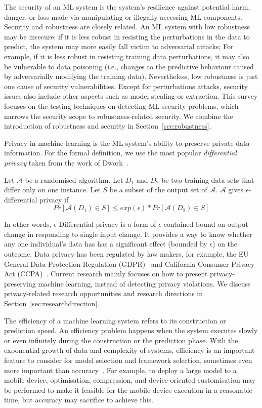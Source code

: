 The security of an ML system is the system's resilience against potential harm, danger, or loss made via manipulating or illegally accessing ML components.
Security and robustness are closely related. 
An ML system with low robustness may be insecure:
if it is less robust in resisting the perturbations in the data to predict, the system may more easily fall victim to adversarial attacks;
For example,
if it is less robust in resisting training data perturbations, it may also be vulnerable to data poisoning (i.e., changes to the predictive behaviour caused by adversarially modifying the training data).
Nevertheless, low robustness is just one cause of security vulnerabilities.
Except for perturbations attacks, security issues also include other aspects such as model stealing or extraction. 
This survey focuses on the testing techniques on detecting ML security problems, which narrows the security scope to robustness-related security.  
We combine the introduction of robustness and security in Section~\ref{sec:robustness}.

Privacy in machine learning is the ML system's ability to preserve private data information. 
For the formal definition, we use the most popular \emph{differential privacy} taken from the work of Dwork~.
\begin{definition}
Let $\mathcal{A}$ be a randomised algorithm.
Let $D_1$ and $D_2$ be two training data sets that differ only on one instance. 
Let $S$ be a subset of the output set of $\mathcal{A}$.
$\mathcal{A}$ gives $\epsilon$-differential privacy if 
\begin{equation}
Pr[\mathcal{A}(D_1)\in S] \leq exp(\epsilon)*Pr[\mathcal{A}(D_2)\in S]
\end{equation}
\end{definition}
In other words, $\epsilon$-Differential privacy is a form of $\epsilon$-contained bound on output change in responding to single input change. 
It provides a way to know whether any one individual's data has has a significant effect (bounded by $\epsilon$) on the outcome. 
Data privacy has been regulated by law makers, for example, the EU General Data Protection Regulation (GDPR)~ and California Consumer Privacy Act (CCPA)~.
Current research mainly focuses on how to present privacy-preserving machine learning, instead of detecting privacy violations.
We discuss privacy-related research opportunities and research directions in Section~\ref{sec:researchdirection}.

The efficiency of a machine learning system refers to its construction or prediction speed. An efficiency problem happens when the system executes slowly or even infinitely during the construction or the prediction phase.
With the exponential growth of data and complexity of systems, efficiency is an important feature to consider for model selection and framework selection, sometimes even more important than accuracy~.
For example, to deploy a large model to a mobile device, optimisation, compression, and device-oriented customisation may be performed to make it feasible for the mobile device execution in a reasonable time, but accuracy may sacrifice to achieve this.

